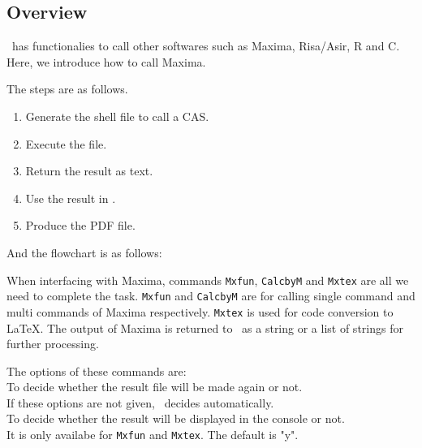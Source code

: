 \documentclass[papersize,a4paper,12pt]{article}
\begin{document}
\subsection{Overview}

\ketcindy\ has functionalies to call other softwares such as Maxima, Risa/Asir, R and C.
Here, we introduce how to call Maxima.\vspace{1mm}

The steps are as follows.\vspace{-2mm}

\begin{enumerate}
\item Generate the shell file to call a CAS.\vspace{-2mm}
\item Execute the file.\vspace{-2mm}
\item Return the result as text.\vspace{-2mm}
\item Use the result in \ketcindy .\vspace{-2mm}
\item Produce the PDF file.\vspace{-2mm}
\end{enumerate}

And the flowchart is  as follows:
\begin{center}
{\scalebox{0.9}{}}

\end{center}

When interfacing with Maxima, commands \texttt{Mxfun}, \texttt{CalcbyM} and \texttt{Mxtex} are all we need to complete the task. \texttt{Mxfun} and \texttt{CalcbyM} are for calling single command and multi commands of Maxima respectively. \texttt{Mxtex} is used for code conversion to \LaTeX. The output of Maxima  is returned to \ketcindy\ as a string or a list of strings for further processing. 

The options of these commands are:\\
\hspace*{10mm}To decide whether the result file will be  made again or not. \\
\hspace*{10mm}\Ltab{25mm}{}If these options are not given, \ketcindy\ decides automatically.\\
\hspace*{10mm}To decide whether the result will be displayed in the console or not. \\
\hspace*{10mm}\Ltab{25mm}{}It is only availabe for \texttt{Mxfun} and \texttt{Mxtex}.
The default is "y".
\end{document}
